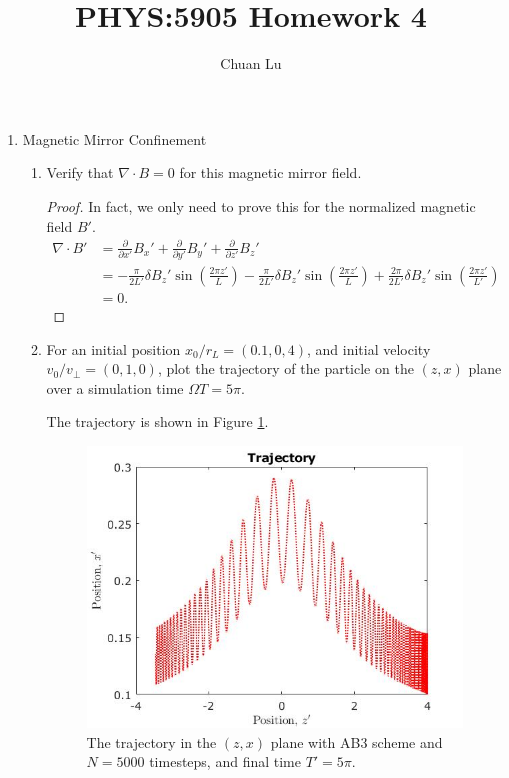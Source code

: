 \documentclass{article}
\begin{document}
\author{Chuan Lu}
\title{PHYS:5905 Homework 4}
\maketitle

\medskip

\begin{enumerate}
\item
Magnetic Mirror Confinement

\begin{enumerate}
\item Verify that $\nabla\cdot B = 0$ for this magnetic mirror field.

\begin{proof}
In fact, we only need to prove this for the normalized magnetic field $B'$.
$$
\begin{aligned}
\nabla\cdot B' &= \frac{\partial}{\partial x'}B_x'+ \frac{\partial }{\partial y'}B_y' + \frac{\partial }{\partial z'} B_z' \\
&= -\frac{\pi}{2L'}\delta B_z'\sin(\frac{2\pi z'}{L}) -\frac{\pi}{2L'}\delta B_z'\sin(\frac{2\pi z'}{L}) + \frac{2\pi}{2L'}\delta B_z'\sin(\frac{2\pi z'}{L'}) \\
&= 0.
\end{aligned}
$$
\end{proof}

\item 
For an initial position $x_0/r_L = (0.1, 0, 4)$, and initial velocity $v_0/v_\perp = (0, 1, 0)$, plot the trajectory of the particle on the $(z, x)$ plane over a simulation time $\Omega T = 5\pi$.

The trajectory is shown in Figure \ref{problem 1.1}.
\begin{figure}[h]
\centering
\vbox{
\includegraphics[scale=0.4]{problem4a/trajectory_zx_5000.jpg}
}
\caption{The trajectory in the $(z, x)$ plane with AB3 scheme and $N=5000$ timesteps, and final time $T' = 5\pi$.}
\label{problem 1.1}
\end{figure}


\end{enumerate}
\end{enumerate}
\end{document}
